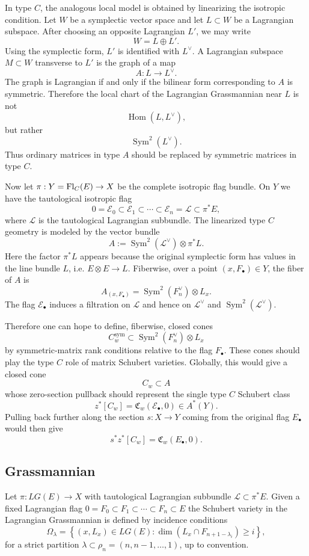 \documentclass[12pt]{article}
\begin{document}
In type $C$, the analogous local model is obtained by linearizing the isotropic condition. Let $W$ be a symplectic vector space and let $L\subset W$ be a Lagrangian subspace. After choosing an opposite Lagrangian $L'$, we may write
\[
    W=L\oplus L'.
\]
Using the symplectic form, $L'$ is identified with $L^\vee$. A Lagrangian subspace $M\subset W$ transverse to $L'$ is the graph of a map
\[
    A:L\longrightarrow L^\vee.
\]
The graph is Lagrangian if and only if the bilinear form corresponding to $A$ is symmetric. Therefore the local chart of the Lagrangian Grassmannian near $L$ is not
\[
    \operatorname{Hom}(L,L^\vee),
\]
but rather
\[
    \operatorname{Sym}^2(L^\vee).
\]
Thus ordinary matrices in type $A$ should be replaced by symmetric matrices in type $C$.

Now let $\pi:Y=\operatorname{Fl}_C(E)\to X$ be the complete isotropic flag bundle. On $Y$ we have the tautological isotropic flag
\[
    0=\mathcal E_0\subset \mathcal E_1\subset\cdots\subset \mathcal E_n=\mathcal L\subset \pi^*E,
\]
where $\mathcal L$ is the tautological Lagrangian subbundle. The linearized type $C$ geometry is modeled by the vector bundle
\[
    A:=\operatorname{Sym}^2(\mathcal L^\vee)\otimes \pi^*L.
\]
Here the factor $\pi^*L$ appears because the original symplectic form has values in the line bundle $L$, i.e. $E\otimes E\to L$. Fiberwise, over a point $(x,F_\bullet)\in Y$, the fiber of $A$ is
\[
    A_{(x,F_\bullet)}
    =
    \operatorname{Sym}^2(F_n^\vee)\otimes L_x.
\]
The flag $\mathcal E_\bullet$ induces a filtration on $\mathcal L$ and hence on $\mathcal L^\vee$ and $\operatorname{Sym}^2(\mathcal L^\vee)$.


Therefore one can hope to define, fiberwise, closed cones
\[
    C_w^{\mathrm{sym}}\subset \operatorname{Sym}^2(F_n^\vee)\otimes L_x
\]
by symmetric-matrix rank conditions relative to the flag $F_\bullet$. These cones should play the type $C$ role of matrix Schubert varieties. Globally, this would give a closed cone
\[
    C_w\subset A
\]
whose zero-section pullback should represent the single type $C$ Schubert class
\[
    z^*[C_w]
    =
    \mathfrak C_w(\mathcal E_\bullet,0)
    \in A^*(Y).
\]
Pulling back further along the section $s:X\to Y$ coming from the original flag $E_\bullet$ would then give
\[
    s^*z^*[C_w]
    =
    \mathfrak C_w(E_\bullet,0).
\]
\subsection{Grassmannian}
Let $\pi\colon LG(E)\to X$ with tautological Lagrangian subbundle $\mathcal{L}\subset \pi^*E$.
Given a fixed Lagrangian flag $0=F_0\subset F_1\subset\cdots\subset F_n\subset E$
the Schubert variety in the Lagrangian Grassmannian is defined by incidence conditions
\[
    \Omega_\lambda
    =
    \left\{ (x,L_x)\in LG(E) : \dim(L_x\cap F_{n+1-\lambda_i})\ge i
    \right\},
\]
for a strict partition $\lambda\subset \rho_n=(n,n-1,\ldots,1)$, up to convention.
\end{document}
